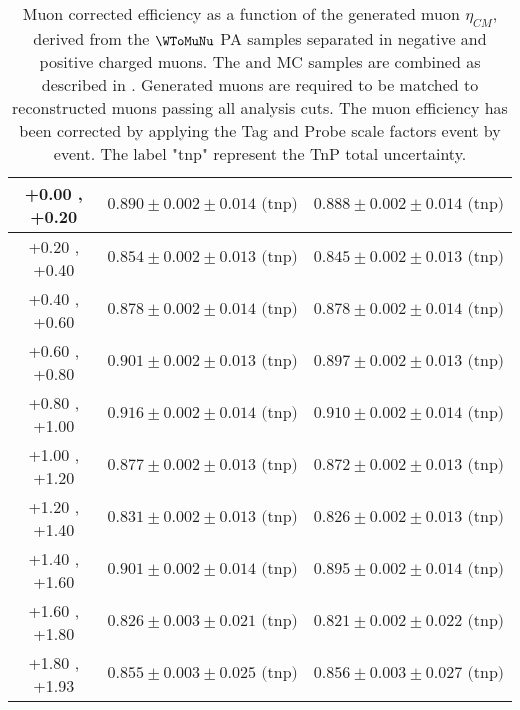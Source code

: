 \begin{table}[h!]
\begin{tabular}{|c|*2c|}
    +0.00 , +0.20 & $0.890 \pm 0.002 \pm 0.014 \textrm{ (tnp)}$ & $0.888 \pm 0.002 \pm 0.014 \textrm{ (tnp)}$\\
    \hline
    +0.20 , +0.40 & $0.854 \pm 0.002 \pm 0.013 \textrm{ (tnp)}$ & $0.845 \pm 0.002 \pm 0.013 \textrm{ (tnp)}$\\
    \hline
    +0.40 , +0.60 & $0.878 \pm 0.002 \pm 0.014 \textrm{ (tnp)}$ & $0.878 \pm 0.002 \pm 0.014 \textrm{ (tnp)}$\\
    \hline
    +0.60 , +0.80 & $0.901 \pm 0.002 \pm 0.013 \textrm{ (tnp)}$ & $0.897 \pm 0.002 \pm 0.013 \textrm{ (tnp)}$\\
    \hline
    +0.80 , +1.00 & $0.916 \pm 0.002 \pm 0.014 \textrm{ (tnp)}$ & $0.910 \pm 0.002 \pm 0.014 \textrm{ (tnp)}$\\
    \hline
    +1.00 , +1.20 & $0.877 \pm 0.002 \pm 0.013 \textrm{ (tnp)}$ & $0.872 \pm 0.002 \pm 0.013 \textrm{ (tnp)}$\\
    \hline
    +1.20 , +1.40 & $0.831 \pm 0.002 \pm 0.013 \textrm{ (tnp)}$ & $0.826 \pm 0.002 \pm 0.013 \textrm{ (tnp)}$\\
    \hline
    +1.40 , +1.60 & $0.901 \pm 0.002 \pm 0.014 \textrm{ (tnp)}$ & $0.895 \pm 0.002 \pm 0.014 \textrm{ (tnp)}$\\
    \hline
    +1.60 , +1.80 & $0.826 \pm 0.003 \pm 0.021 \textrm{ (tnp)}$ & $0.821 \pm 0.002 \pm 0.022 \textrm{ (tnp)}$\\
    \hline
    +1.80 , +1.93 & $0.855 \pm 0.003 \pm 0.025 \textrm{ (tnp)}$ & $0.856 \pm 0.003 \pm 0.027 \textrm{ (tnp)}$\\
    \hline
  \end{tabular}
  \caption{Muon corrected efficiency as a function of the generated muon $\eta_{CM}$, derived from the $\WToMuNu$ PA \POWHEG samples separated in negative and positive charged muons.  The \pPb and \Pbp MC samples are combined as described in . Generated muons are required to be matched to reconstructed muons passing all analysis cuts. The muon efficiency has been corrected by applying the Tag and Probe scale factors event by event. The label "tnp" represent the TnP total uncertainty.}
  \label{tab:corrEfficiency_WToMu_PA}
\end{table}


